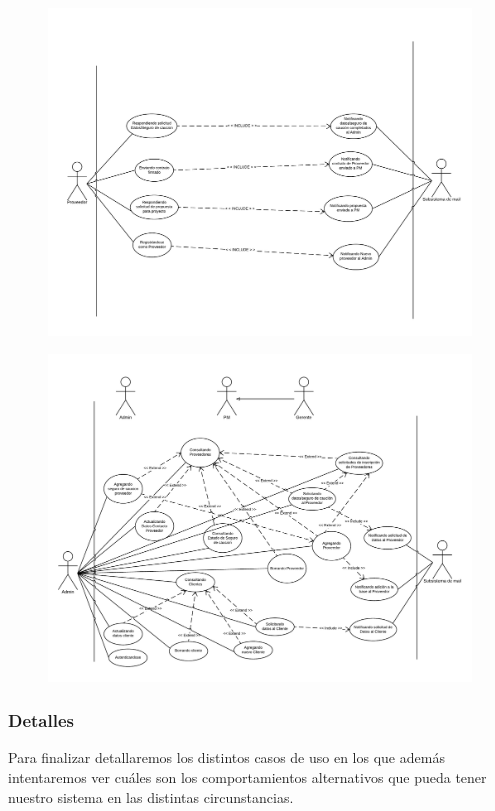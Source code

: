 \begin{figure}[H]
\centering
\includegraphics[width=\linewidth]{diag/viejos/cu5.pdf}
\end{figure}

\begin{figure}[H]
\centering
\includegraphics[width=\linewidth]{diag/viejos/cu6.pdf}
\end{figure}

    \subsubsection{Detalles}
Para finalizar detallaremos los distintos casos de uso en los que además intentaremos ver cuáles son los comportamientos alternativos que pueda tener nuestro sistema en las distintas circunstancias.

